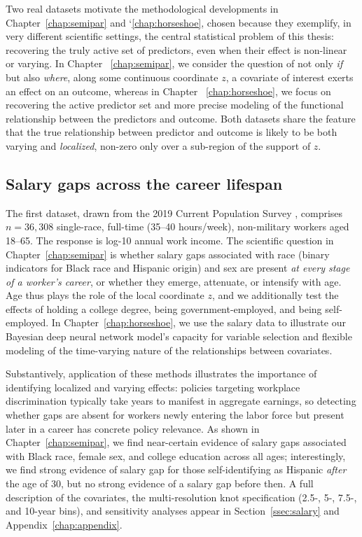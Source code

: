 Two real datasets motivate the methodological developments in Chapter~\ref{chap:semipar} and `\ref{chap:horseshoe}, chosen because they exemplify, in very different scientific settings, the central statistical problem of this thesis: recovering the truly active set of predictors, even when their effect is non-linear or varying.  In Chapter ~\ref{chap:semipar}, we consider the question of not only \emph{if} but also \emph{where}, along some continuous coordinate $z$, a covariate of interest exerts an effect on an outcome, whereas in Chapter ~\ref{chap:horseshoe}, we focus on recovering the active predictor set and more precise modeling of the functional relationship between the predictors and outcome.  Both datasets share the feature that the true relationship between predictor and outcome is likely to be both varying and \emph{localized}, non-zero only over a sub-region of the support of $z$.  


\subsection*{Salary gaps across the career lifespan}

The first dataset, drawn from the 2019 Current Population Survey \citep{flood:2020}, comprises $n=36{,}308$ single-race, full-time (35--40 hours/week), non-military workers aged 18--65. The response is log-10 annual work income. The scientific question in Chapter~\ref{chap:semipar} is whether salary gaps associated with race (binary indicators for Black race and Hispanic origin) and sex are present \emph{at every stage of a worker's career}, or whether they emerge, attenuate, or intensify with age.  Age thus plays the role of the local coordinate $z$, and we additionally test the effects of holding a college degree, being government-employed, and being self-employed.  In Chapter~\ref{chap:horseshoe}, we use the salary data to illustrate our Bayesian deep neural network model's capacity for variable selection and flexible modeling of the time-varying nature of the relationships between covariates.

Substantively, application of these methods illustrates the importance of identifying localized and varying effects: policies targeting workplace discrimination typically take years to manifest in aggregate earnings, so detecting whether gaps are absent for workers newly entering the labor force but present later in a career has concrete policy relevance. As shown in Chapter~\ref{chap:semipar}, we find near-certain evidence of salary gaps associated with Black race, female sex, and college education across all ages; interestingly, we find strong evidence of salary gap for those self-identifying as Hispanic \emph{after} the age of 30, but no strong evidence of a salary gap before then. A full description of the covariates, the multi-resolution knot specification (2.5-, 5-, 7.5-, and 10-year bins), and sensitivity analyses appear in Section~\ref{ssec:salary} and Appendix~\ref{chap:appendix}.

